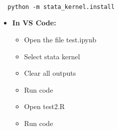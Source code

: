 \documentclass[12pt]{article}
\begin{document}
  \begin{verbatim}

  python -m stata_kernel.install

  \end{verbatim}
  
\begin{itemize}  
  \item \textbf{In VS Code:} 
    \begin{itemize}
      \item Open the file test.ipynb
      \item Select stata kernel
      \item Clear all outputs
      \item Run code
    \end{itemize}
    \begin{itemize}
      \item Open test2.R 
      \item Run code
    \end{itemize}
\end{itemize}
\end{document}
